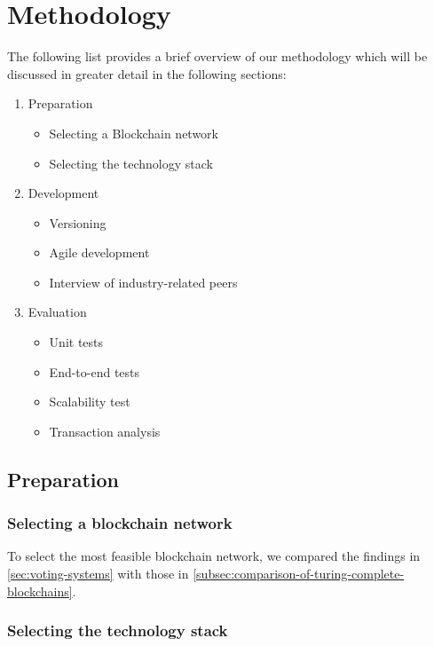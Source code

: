 \chapter{Methodology}\label{ch:methodology}

The following list provides a brief overview of our methodology which will be discussed in greater detail in the following sections:

\begin{enumerate}
    \item Preparation
    \begin{itemize}
        \item Selecting a \gls{Blockchain} network
        \item Selecting the technology stack
    \end{itemize}
    \item Development
    \begin{itemize}
        \item Versioning
        \item Agile development
        \item Interview of industry-related peers
    \end{itemize}
    \item Evaluation
    \begin{itemize}
        \item Unit tests
        \item End-to-end tests
        \item Scalability test
        \item Transaction analysis
    \end{itemize}
\end{enumerate}

\section{Preparation}\label{sec:preparation}

\subsection{Selecting a blockchain network}\label{subsec:selection-of-blockchain-network2}

To select the most feasible blockchain network, we compared the findings in \cref{sec:voting-systems} with those in \cref{subsec:comparison-of-turing-complete-blockchains}.

\subsection{Selecting the technology stack}\label{subsec:selection-of-technology-stack}


